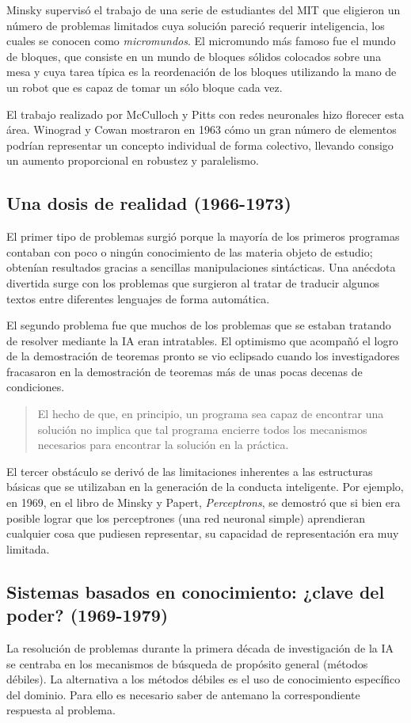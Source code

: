 \documentclass[12pt,a4paper]{article}
\begin{document}
Minsky supervisó el trabajo de una serie de estudiantes del MIT que eligieron un número de problemas limitados cuya solución pareció requerir inteligencia, los cuales se conocen como \emph{micromundos}. El micromundo más famoso fue el mundo de bloques, que consiste en un mundo de bloques sólidos colocados sobre una mesa y cuya tarea típica es la reordenación de los bloques utilizando la mano de un robot que es capaz de tomar un sólo bloque cada vez.

El trabajo realizado por McCulloch y Pitts con redes neuronales hizo florecer esta área. Winograd y Cowan mostraron en 1963 cómo un gran número de elementos podrían representar un concepto individual de forma colectivo, llevando consigo un aumento proporcional en robustez y paralelismo.

\subsection{Una dosis de realidad (1966-1973)}El primer tipo de problemas surgió porque la mayoría de los primeros programas contaban con poco o ningún conocimiento de las materia objeto de estudio; obtenían resultados gracias a sencillas manipulaciones sintácticas. Una anécdota divertida surge con los problemas que surgieron al tratar de traducir algunos textos entre diferentes lenguajes de forma automática.

El segundo problema fue que muchos de los problemas que se estaban tratando de resolver mediante la IA eran intratables. El optimismo que acompañó el logro de la demostración de teoremas pronto se vio eclipsado cuando los investigadores fracasaron en la demostración de teoremas más de unas pocas decenas de condiciones. \begin{quote}\small El hecho de que, en principio, un programa sea capaz de encontrar una solución no implica que tal programa encierre todos los mecanismos necesarios para encontrar la solución en la práctica.\end{quote}

El tercer obstáculo se derivó de las limitaciones inherentes a las estructuras básicas que se utilizaban en la generación de la conducta inteligente. Por ejemplo, en 1969, en el libro de Minsky y Papert, \emph{Perceptrons}, se demostró que si bien era posible lograr que los perceptrones (una red neuronal simple) aprendieran cualquier cosa que pudiesen representar, su capacidad de representación era muy limitada.

\subsection{Sistemas basados en conocimiento: ¿clave del poder? (1969-1979)}
La resolución de problemas durante la primera década de investigación de la IA se centraba en los mecanismos de búsqueda de propósito general (métodos débiles). La alternativa a los métodos débiles es el uso de conocimiento específico del dominio. Para ello es necesario saber de antemano la correspondiente respuesta al problema.
\end{document}
